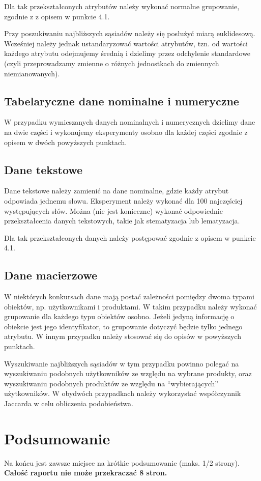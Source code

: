 \documentclass[a4paper,11pt]{article}
\begin{document}
Dla tak przekształconych atrybutów należy wykonać normalne grupowanie, zgodnie z z opisem w punkcie 4.1.

Przy poszukiwaniu najbliższych sąsiadów należy się posłużyć miarą euklidesową. Wcześniej należy jednak ustandaryzować wartości atrybutów, tzn. od wartości każdego atrybutu odejmujemy średnią i dzielimy przez odchylenie standardowe (czyli przeprowadzamy zmienne o różnych jednostkach do zmiennych niemianowanych).

\subsection{Tabelaryczne dane nominalne i numeryczne}

W przypadku wymieszanych danych nominalnych i numerycznych dzielimy dane na dwie części i wykonujemy eksperymenty osobno dla każdej części zgodnie z opisem w dwóch powyższych punktach.

\subsection{Dane tekstowe}

Dane tekstowe należy zamienić na dane nominalne, gdzie każdy atrybut odpowiada jednemu słowu. Eksperyment należy wykonać dla 100 najczęściej występujących słów. Można (nie jest konieczne) wykonać odpowiednie przekształcenia danych tekstowych, takie jak stematyzacja lub lematyzacja.

Dla tak przekształconych danych należy postępować zgodnie z opisem w punkcie 4.1.

\subsection{Dane macierzowe}

W niektórych konkursach dane mają postać zależności pomiędzy dwoma typami obiektów, np. użytkownikami i produktami. W takim przypadku należy wykonać grupowanie dla każdego typu obiektów osobno. Jeżeli jedyną informację o obiekcie jest jego identyfikator, to grupowanie dotyczyć będzie tylko jednego atrybutu. W innym przypadku należy stosować się do opisów w powyższych punktach.

Wyszukiwanie najbliższych sąsiadów w tym przypadku powinno polegać na wyszukiwaniu podobnych użytkowników ze względu na wybrane produkty, oraz wyszukiwaniu podobnych produktów ze względu na ``wybierających'' użytkowników. W obydwóch przypadkach należy wykorzystać współczynnik Jaccarda w celu obliczenia podobieństwa.


\section{Podsumowanie}

Na końcu jest zawsze miejsce na krótkie podsumowanie (maks. 1/2 strony). {\bf Całość raportu nie może przekraczać 8 stron.}
\end{document}
